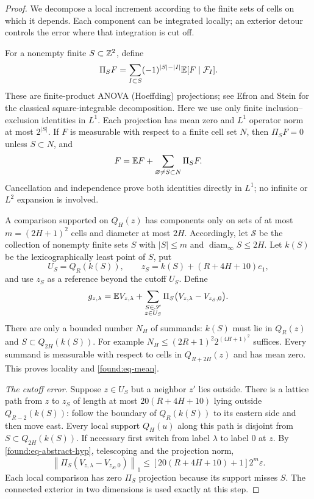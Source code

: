 \begin{proof}
We decompose a local increment according to the finite sets of cells
on which it depends.  Each component can be integrated locally; an
exterior detour controls the error where that integration is cut off.

For a nonempty finite $S\subset\mathbb Z^2$, define
\[
 \Pi_S F=\sum_{I\subset S}(-1)^{|S|-|I|}
                 \mathbb E [F\mid\mathcal F_I].
\]
These are finite-product ANOVA (Hoeffding) projections; see
Efron and Stein \cite[Section~2]{EfronStein1981} for the classical
square-integrable decomposition. Here we use only finite
inclusion--exclusion identities in $L^1$. Each projection has mean
zero and $L^1$ operator norm at most $2^{|S|}$.
If $F$ is measurable with respect to a finite cell set $N$, then
$\Pi_SF=0$ unless $S\subset N$, and
\begin{equation}
 F=\mathbb E F+\sum_{\varnothing\ne S\subset N}\Pi_SF.
                                                        \label{found:eq-anova}
\end{equation}
Cancellation and independence prove both identities directly in
$L^1$; no infinite or $L^2$ expansion is involved.

A comparison supported on $Q_H(z)$ has components only on sets of
at most $m=(2H+1)^2$ cells and diameter at most $2H$.  Accordingly,
let $\mathscr S$ be the collection of nonempty finite
sets $S$ with $|S|\leq m$ and $\operatorname{diam}_\infty S\leq2H$.
Let $k(S)$ be the lexicographically least point of $S$, put
\[
 U_S=Q_R(k(S)),\qquad
 z_S=k(S)+(R+4H+10)e_1,
\]
and use $z_S$ as a reference beyond the cutoff $U_S$.  Define
\begin{equation}
 g_{z,\lambda}=\mathbb E V_{z,\lambda}
    +\sum_{\substack{S\in\mathscr S\\z\in U_S}}
       \Pi_S\bigl(V_{z,\lambda}-V_{z_S,0}\bigr).
                                                        \label{found:eq-gauge-formula}
\end{equation}
There are only a bounded number $N_H$ of summands: $k(S)$ must lie in
$Q_R(z)$ and $S\subset Q_{2H}(k(S))$.  For example
$N_H\leq(2R+1)^2 2^{(4H+1)^2}$ suffices.  Every summand is measurable
with respect to cells in $Q_{R+2H}(z)$ and has mean zero.  This proves
locality and \eqref{found:eq-mean}.

\emph{The cutoff error.}
Suppose $z\in U_S$ but a neighbor $z'$ lies outside.  There is a
lattice path from $z$ to
$z_S$ of length at most $20(R+4H+10)$ lying outside
$Q_{R-2}(k(S))$: follow the boundary of $Q_R(k(S))$ to its eastern
side and then move east.  Every local support $Q_H(u)$ along this path
is disjoint from $S\subset Q_{2H}(k(S))$.  If necessary first switch
from label $\lambda$ to label $0$ at $z$.  By
\eqref{found:eq-abstract-hyp}, telescoping and the projection norm,
\begin{equation}
 \left\|\Pi_S(V_{z,\lambda}-V_{z_S,0})\right\|_1
 \leq [20(R+4H+10)+1]2^m\varepsilon.
                                                        \label{found:eq-boundary}
\end{equation}
Each local comparison has zero $\Pi_S$ projection because its support
misses $S$.  The connected exterior in two dimensions is used exactly
at this step.


\end{proof}
